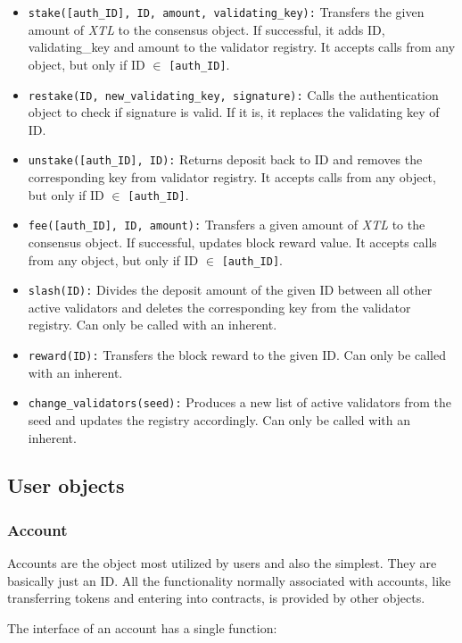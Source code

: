 \documentclass[conference]{IEEEtran}
\begin{document}
\begin{itemize}
	\item \texttt{stake([auth\_ID], ID, amount, validating\_key):} Transfers the given amount of \textit{XTL} to the consensus object. If successful, it adds ID, validating\_key and amount to the validator registry. It accepts calls from any object, but only if ID $\in$ \texttt{\texttt{[auth\_ID]}}.
	\item \texttt{restake(ID, new\_validating\_key, signature):} Calls the authentication object to check if signature is valid. If it is, it replaces the validating key of ID.
	\item \texttt{unstake([auth\_ID], ID):} Returns deposit back to ID and removes the corresponding key from validator registry. It accepts calls from any object, but only if ID $\in$ \texttt{[auth\_ID]}.
	\item \texttt{fee([auth\_ID], ID, amount):} Transfers a given amount of \textit{XTL} to the consensus object. If successful, updates block reward value. It accepts calls from any object, but only if ID $\in$ \texttt{[auth\_ID]}.
	\item \texttt{slash(ID):} Divides the deposit amount of the given ID between all other active validators and deletes the corresponding key from the validator registry. Can only be called with an inherent.
	\item \texttt{reward(ID):} Transfers the block reward to the given ID. Can only be called with an inherent.
	\item \texttt{change\_validators(seed):} Produces a new list of active validators from the seed and updates the registry accordingly. Can only be called with an inherent.
\end{itemize}

\subsection{User objects}

\subsubsection{Account}
Accounts are the object most utilized by users and also the simplest. They are basically just an ID. All the functionality normally associated with accounts, like transferring tokens and entering into contracts, is provided by other objects.

The interface of an account has a single function:
\end{document}
